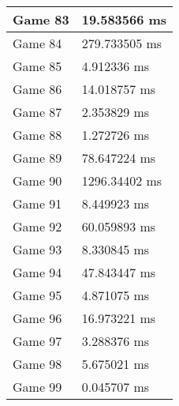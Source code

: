 \begin{tabular}{|l|l|}
	Game 83 & 19.583566 ms \\ \hline
	Game 84 & 279.733505 ms \\ \hline
	Game 85 & 4.912336 ms \\ \hline
	Game 86 & 14.018757 ms \\ \hline
	Game 87 & 2.353829 ms \\ \hline
	Game 88 & 1.272726 ms \\ \hline
	Game 89 & 78.647224 ms \\ \hline
	Game 90 & 1296.34402 ms \\ \hline
	Game 91 & 8.449923 ms \\ \hline
	Game 92 & 60.059893 ms \\ \hline
	Game 93 & 8.330845 ms \\ \hline
	Game 94 & 47.843447 ms \\ \hline
	Game 95 & 4.871075 ms \\ \hline
	Game 96 & 16.973221 ms \\ \hline
	Game 97 & 3.288376 ms \\ \hline
	Game 98 & 5.675021 ms \\ \hline
	Game 99 & 0.045707 ms \\ \hline
\end{tabular}
